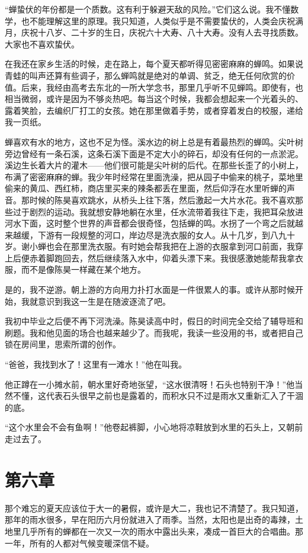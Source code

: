 \documentclass[lang=cn]{elegantpaper}
\begin{document}
“蝉蛰伏的年份都是一个质数。这有利于躲避天敌的风险。”它们这么说。我不懂数学，也不能理解这里的原理。我只知道，人类似乎是不需要蛰伏的，人类会庆祝满月，庆祝十八岁、二十岁的生日，庆祝六十大寿、八十大寿。没有人去寻找质数。大家也不喜欢蛰伏。

在我还在家乡生活的时候，走在路上，每个夏天都听得见密密麻麻的蝉鸣。如果说青蛙的叫声还算有些调子，那么蝉鸣就是绝对的单调、贫乏，绝无任何欣赏的价值。后来，我经由高考去东北的一所大学念书，那里几乎听不见蝉鸣。即使有，也相当微弱，或许是因为不够炎热吧。每当这个时候，我都会想起来一个光着头的、露着笑脸，去编织厂打工的女孩。她在那里做着手势，或者穿着发白的校服，递给我一页纸。

蝉喜欢有水的地方，这也不足为怪。溪水边的树上总是有着最热烈的蝉鸣。尖叶树旁边曾经有一条石溪，这条石溪下面是不定大小的碎石，却没有任何的一点淤泥。溪边生长着大片的灌木——他们很可能是尖叶树的后代。在那些长歪了的小树上，布满了密密麻麻的蝉。我少年时经常在里面洗澡，把从园子中偷来的桃子，菜地里偷来的黄瓜、西红柿，商店里买来的辣条都丢在里面，然后仰浮在水里听蝉的声音。那时候的陈昊喜欢跳水，从桥头上往下落，然后激起一大片水花。我不喜欢那些过于剧烈的运动。我就想安静地躺在水里，任水流带着我往下走，我把耳朵放进河水下面，这时整个世界的声音都会很奇怪，包括蝉的鸣。水拐了一个弯之后就越来越缓，下游有一段规整的河口，岸边尽是洗衣服的女人。从十几岁，到八九十岁。谢小蝉也会在那里洗衣服。有时她会帮我把在上游的衣服拿到河口前面，我穿上后便赤着脚跑回去，然后继续落入水中，仰着头漂下来。我很感激她能帮我拿衣服，而不是像陈昊一样藏在某个地方。

是的，我不逆游。朝上游的方向用力扑打水面是一件很累人的事。或许从那时候开始，我就意识到我这一生是在随波逐流了吧。

我初中毕业之后便不再下河洗澡。陈昊读高中时，假日的时间完全交给了辅导班和刷题。我和他见面的场合也越来越少了。而我呢，我读一些没用的书，或者把自己锁在房间里，思索所谓的创作。

“爸爸，我找到水了！这里有一滩水！”他在叫我。

他正蹲在一小摊水前，朝水里好奇地张望，“这水很清呀！石头也特别干净！”他当然不懂，这代表石头很早之前也是露着的，而积水只不过是雨水又重新汇入了干涸的底。

“这个水里会不会有鱼啊！”他卷起裤脚，小心地将凉鞋放到水里的石头上，又朝前走过去了。

\section{第六章}
\label{sec:org4f62ea8}

那个难忘的夏天应该位于大一的暑假，或许是大二，我也记不清楚了。我只知道，那年的雨水很多，早在阳历六月份就进入了雨季。当然，太阳也是出奇的毒辣，土地里几乎所有的蝉都在一次又一次的雨水中露出头来，凑成一首巨大的合唱曲。那一年，所有的人都对气候变暖深信不疑。
\end{document}
